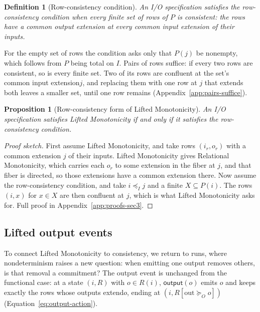 \documentclass[sigconf]{cidr-2027}
\newtheorem{proposition}{Proposition}
\newtheorem{definition}{Definition}
\theoremstyle{remark}
\newcommand{\InputOrd}{\preceq_I}
\newcommand{\OutputGe}{\succeq_O}
\newcommand{\commitment}{commitment\xspace}
\newcommand{\indesc}{input extension\xspace} %
\newcommand{\outrel}{extends\xspace}          %
\newcommand{\outrelbase}{extend\xspace}       %
\newcommand{\outnoun}{output extension\xspace}%
\newcommand{\spectype}[1][]{I/O specification#1\xspace}
\newcommand{\fiber}[1]{P(#1)}
\begin{document}
\begin{definition}[Row-consistency condition]
\label{def:common-expansion-condition}
\textcolor{reviewed}{An \spectype satisfies the \emph{row-consistency condition} when every finite set of rows of $P$ is consistent: the rows have a common \outnoun at every common \indesc of their inputs.}
\end{definition}

For the empty set of rows the condition asks only that $P(j)$ be nonempty, which
follows from $P$ being total on $I$. \textcolor{reviewed}{Pairs of rows suffice: if every two rows are consistent, so is every finite
set.} \textcolor{reviewed}{Two of its rows are confluent at the set's common \indesc $j$, and
replacing them with one row at $j$ that \outrel both leaves a smaller set,
until one row remains
(Appendix~\ref{app:pairs-suffice}).}

\begin{proposition}[Row-consistency form of Lifted Monotonicity]
\label{prop:common-expansion-form}
\textcolor{reviewed}{An \spectype satisfies Lifted Monotonicity if and only
if it satisfies the row-consistency condition.}
\end{proposition}

\begin{proof}[Proof sketch]
\textcolor{reviewed}{First assume Lifted Monotonicity, and take rows $(i_r,o_r)$ with a common extension $j$ of their inputs.} Lifted Monotonicity gives Relational Monotonicity, which carries each $o_r$ to some extension in the fiber at $j$, and that fiber is directed, so those extensions have a common extension there. Now assume the row-consistency
condition, and take $i\InputOrd j$ and a finite $X\subseteq\fiber{i}$. The
rows $(i,x)$ for $x\in X$ are then confluent at $j$, which is what Lifted Monotonicity asks for. Full proof in
Appendix~\ref{app:proofs-sec3}.
\end{proof}

\subsection{Lifted output events}
\label{sec:lifted-output-events}

\textcolor{reviewed}{To connect Lifted Monotonicity to consistency, we return to runs, where
nondeterminism raises a new question: when emitting one output removes others,
is that removal a \commitment?} \textcolor{reviewed}{The output event is unchanged from the
functional case: at a state $(i,R)$ with $o\in R(i)$, $\mathsf{output}(o)$ emits
$o$ and keeps exactly the rows whose outputs \outrelbase $o$, ending at
$(i,R[\mathrm{out}\OutputGe o])$ (Equation~\ref{eq:output-action}).}
\end{document}
